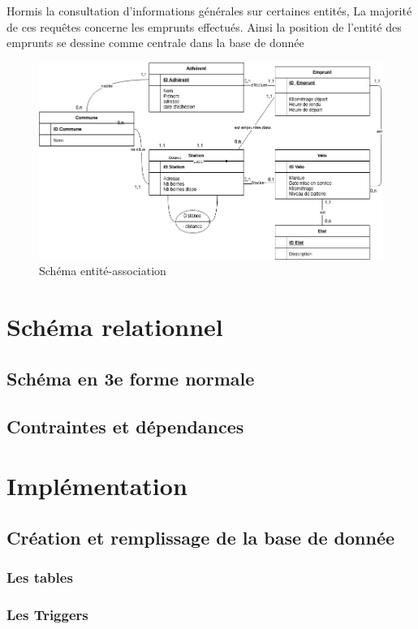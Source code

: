 \documentclass[10pt]{article}
\begin{document}
  Hormis la consultation d'informations générales sur certaines entités, La majorité de ces requêtes concerne les emprunts effectués.
  Ainsi la position de l'entité des emprunts se dessine comme centrale dans la base de donnée
  \begin{figure}[!h]
    \includegraphics[scale=0.5]{img/entite_association}
    \caption{Schéma entité-association}
    \label{entite}
  \end{figure}
  \section{Schéma relationnel}\label{sec:relationel}
  \subsection{Schéma en 3e forme normale}\label{subsec:normal}

  \subsection{Contraintes et dépendances}\label{subsec:contrainte}

  \section{Implémentation}\label{sec:implementation}
  \subsection{Création et remplissage de la base de donnée}\label{subsec:crea}
  \subsubsection{Les tables}
  \subsubsection{Les Triggers}
\end{document}
